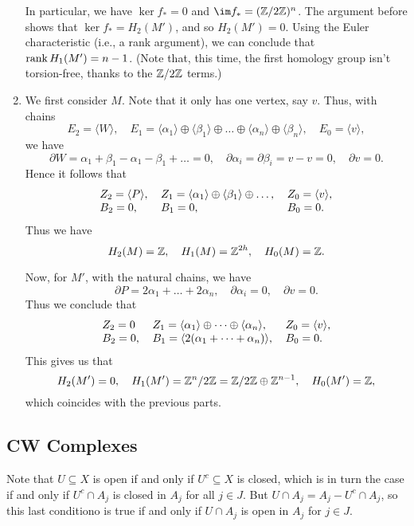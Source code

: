 \documentclass[../../solutions.tex]{subfiles}
\begin{document}
\begin{exercise}
\begin{enumerate}
In particular, we have $\ker f_*=0$ and $\im f_*=(\ZZ/2\ZZ)^n$.
The argument before shows that $\ker f_*=H_2(M')$, and so $H_2(M')=0$.
Using the Euler characteristic (i.e., a rank argument), we can conclude that $\operatorname{rank} H_1(M')=n-1$.
(Note that, this time, the first homology group isn't torsion-free, thanks to the $\mathbb{Z}/2\mathbb{Z}$ terms.)

\item
We first consider $M$.
Note that it only has one vertex, say $v$.
Thus, with chains
\[E_2=\langle W\rangle,\quad E_1=\langle\alpha_1\rangle\oplus\langle\beta_1\rangle\oplus\dots\oplus\langle\alpha_n\rangle\oplus\langle\beta_n\rangle,\quad E_0=\langle v\rangle,\]
we have
\[\partial W=\alpha_1+\beta_1-\alpha_1-\beta_1+\dots=0,\quad\partial\alpha_i=\partial\beta_i=v-v=0,\quad\partial v=0.\]
Hence it follows that
\[
\begin{tabular}{l l l}
$Z_2=\langle P\rangle$, & $Z_1=\langle\alpha_1\rangle\oplus\langle \beta_1\rangle\oplus\dots$, & $Z_0=\langle v\rangle$, \\
$B_2=0$, & $B_1=0$, & $B_0=0$.
\end{tabular}
\]
Thus we have
\[H_2(M)=\mathbb{Z},\quad H_1(M)=\mathbb{Z}^{2h},\quad H_0(M)=\mathbb{Z}.\]

Now, for $M'$, with the natural chains, we have
\[\partial P=2\alpha_1+\dots+2\alpha_n,\quad\partial\alpha_i=0,\quad\partial v=0.\]
Thus we conclude that
\[
\begin{tabular}{l l l}
$Z_2=0$& $Z_1=\langle\alpha_1\rangle\oplus\dots\oplus\langle\alpha_n\rangle$, & $Z_0=\langle v\rangle$, \\
$B_2=0$, & $B_1=\langle2(\alpha_1+\dots+\alpha_n)\rangle$, & $B_0=0$.
\end{tabular}
\]
This gives us that
\[H_2(M')=0,\quad H_1(M')=\mathbb{Z}^n/2\mathbb{Z}=\mathbb{Z}/2\mathbb{Z}\oplus\mathbb{Z}^{n-1},\quad H_0(M')=\mathbb{Z},\]
which coincides with the previous parts.
\end{enumerate}
\end{exercise}

\subsection{CW Complexes}
\begin{exercise} \leavevmode
Note that $U\subseteq X$ is open if and only if $U^c\subseteq X$ is closed, which is in turn the case if and only if $U^c\cap A_j$ is closed in $A_j$ for all $j\in J$.
But $U\cap A_j=A_j-U^c\cap A_j$, so this last conditiono is true if and only if $U\cap A_j$ is open in $A_j$ for $j\in J$.
\end{exercise}
\end{document}
